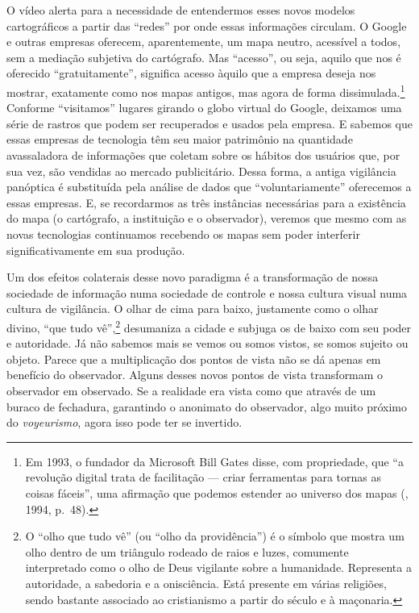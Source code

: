 O vídeo alerta para a necessidade de entendermos esses novos modelos
cartográficos a partir das ``redes'' por onde essas informações
circulam. O Google e outras empresas oferecem, aparentemente, um mapa
neutro, acessível a todos, sem a mediação subjetiva do cartógrafo. Mas
``acesso'', ou seja, aquilo que nos é oferecido ``gratuitamente'',
significa acesso àquilo que a empresa deseja nos mostrar, exatamente
como nos mapas antigos, mas agora de forma dissimulada.\footnote{Em
  1993, o fundador da Microsoft Bill Gates disse, com propriedade, que
  ``a revolução digital trata de facilitação --- criar ferramentas para
  tornas as coisas fáceis'', uma afirmação que
  podemos estender ao universo dos mapas (, 1994, p.~48).} Conforme
``visitamos'' lugares girando o globo virtual do Google, deixamos uma
série de rastros que podem ser recuperados e usados pela empresa. E
sabemos que essas empresas de tecnologia têm seu maior patrimônio na
quantidade avassaladora de informações que coletam sobre os hábitos dos
usuários que, por sua vez, são vendidas ao mercado publicitário.
Dessa forma, a antiga vigilância panóptica é substituída pela análise
de dados que ``voluntariamente'' oferecemos a essas empresas. E, se
recordarmos as três instâncias necessárias para a existência do mapa (o
cartógrafo, a instituição e o observador), veremos que mesmo com as
novas tecnologias continuamos recebendo os mapas sem poder interferir
significativamente em sua produção.

Um dos efeitos colaterais desse novo paradigma é a transformação de
nossa sociedade de informação numa sociedade de controle e nossa cultura
visual numa cultura de vigilância. O olhar de cima para baixo,
justamente como o olhar divino, ``que tudo vê'',\footnote{O ``olho que tudo
  vê'' (ou ``olho da providência'') é o símbolo que mostra um olho
  dentro de um triângulo rodeado de raios e luzes, comumente
  interpretado como o olho de Deus vigilante sobre a humanidade.
  Representa a autoridade, a sabedoria e a onisciência. Está presente em
  várias religiões, sendo bastante associado ao cristianismo a partir do
  século  e à maçonaria.} desumaniza a cidade e subjuga os de
baixo com seu poder e autoridade. Já não sabemos mais se vemos ou somos
vistos, se somos sujeito ou objeto. Parece que a multiplicação dos
pontos de vista não se dá apenas em benefício do observador. Alguns
desses novos pontos de vista transformam o observador em observado. Se a
realidade era vista como que através de um buraco de fechadura,
garantindo o anonimato do observador, algo muito próximo do
\emph{voyeurismo}, agora isso pode ter se invertido.

